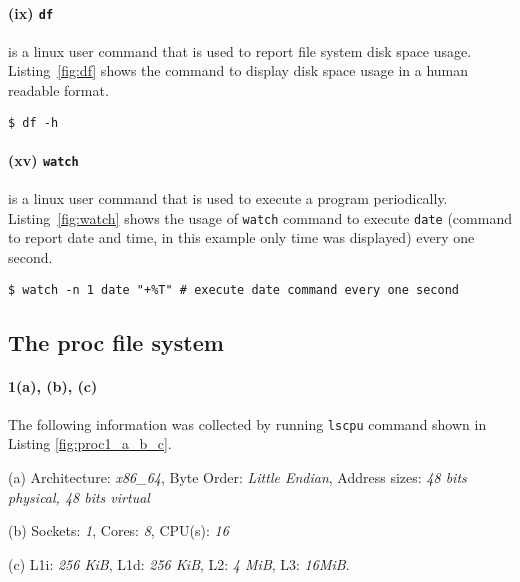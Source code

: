 \documentclass[final,5p,times,authoryear]{elsarticle}
\begin{document}
% 
% 
\paragraph{(ix) {\tt df}}
is a linux user command that is used to report file system disk space usage. Listing~\ref{fig:df} shows the command to display disk space usage in a human readable format.
\begin{lstlisting}[captionpos=b, caption={Code snippet showing the use of {\tt df} command to display disk space usage information in human readable format.},label={fig:df},style=codeBash]
$ df -h 
\end{lstlisting}

% 
% 
\paragraph{(xv) {\tt watch}}
is a linux user command that is used to execute a program periodically. Listing~\ref{fig:watch} shows the usage of {\tt watch} command to execute {\tt date} (command to report date and time, in this example only time was displayed) every one second.
\begin{lstlisting}[captionpos=b, caption={Code snippet showing the use of {\tt watch} command to run the {\tt date} command every one second.},label={fig:watch},style=codeBash]
$ watch -n 1 date "+%T" # execute date command every one second 
\end{lstlisting}

\pagebreak

% 
% 
% 
% 

\subsection{The proc file system}

\paragraph{\bf 1(a), (b), (c)}
The following information was collected by running {\tt lscpu} command shown in Listing \ref{fig:proc1_a_b_c}.  

(a) Architecture: {\it x86\_64},  
Byte Order: {\it Little Endian}, 
Address sizes: {\it 48 bits physical, 48 bits virtual} 

(b) Sockets: {\it 1}, Cores: {\it 8}, CPU(s): {\it 16}

(c) L1i: {\it 256 KiB}, L1d: {\it 256 KiB}, L2: {\it 4 MiB}, L3: {\it 16MiB}.
\end{document}
